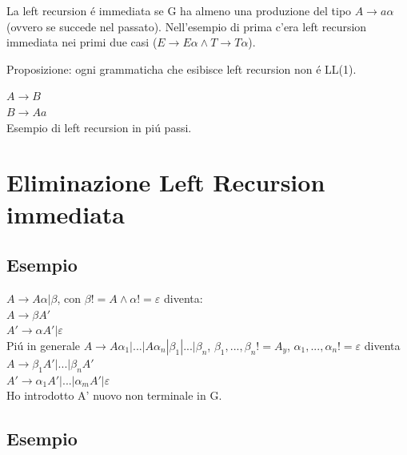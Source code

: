 La left recursion \'e immediata se G ha almeno una produzione del tipo $A \rightarrow a \alpha$ (ovvero se succede nel passato).
Nell'esempio di prima c'era left recursion immediata nei primi due casi ($E \rightarrow E\alpha \land T \rightarrow T\alpha $).

\begin{tcolorbox}\begin{center}
    Proposizione: ogni grammaticha che esibisce left recursion non \'e LL(1).
\end{center}\end{tcolorbox}

$A \rightarrow B$\\
$B \rightarrow Aa$\\
Esempio di left recursion in pi\'u passi.

\section{Eliminazione Left Recursion immediata}

\subsection{Esempio}
$A \rightarrow A \alpha | \beta $, con $\beta != A \land \alpha != \varepsilon$ diventa:\\
$A \rightarrow \beta A'$\\
$A' \rightarrow \alpha A' | \varepsilon$\\

Pi\'u in generale
$A \rightarrow A\alpha _1 | ... | A\alpha _n | \beta _1 | ... | \beta _n $, $\beta _1, ..., \beta _n != A_y$, 
$\alpha_1,...,\alpha_n != \varepsilon$ diventa\\
$A \rightarrow \beta _1 A'|...|\beta _n A' $\\
$A' \rightarrow \alpha _1 A'|...|\alpha _m A' | \varepsilon $\\
Ho introdotto A' nuovo non terminale in G.

\subsection{Esempio}

